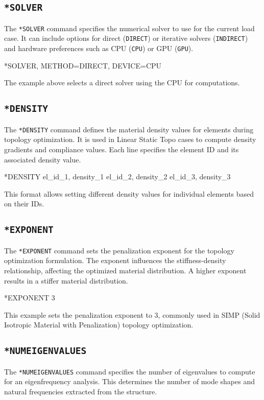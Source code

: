 \subsection{\texttt{*SOLVER}}
The \texttt{*SOLVER} command specifies the numerical solver to use for the current load case.
It can include options for direct (\texttt{DIRECT}) or iterative solvers (\texttt{INDIRECT}) and hardware preferences such as CPU (\texttt{CPU}) or GPU (\texttt{GPU}).

\begin{codeBlock}
*SOLVER, METHOD=DIRECT, DEVICE=CPU
\end{codeBlock}

The example above selects a direct solver using the CPU for computations.

\subsection{\texttt{*DENSITY}}
The \texttt{*DENSITY} command defines the material density values for elements during topology optimization. It is used in Linear Static Topo cases to compute density gradients and compliance values. Each line specifies the element ID and its associated density value.

\begin{codeBlock}
*DENSITY
el_id_1, density_1
el_id_2, density_2
el_id_3, density_3
\end{codeBlock}

This format allows setting different density values for individual elements based on their IDs.

\subsection{\texttt{*EXPONENT}}
The \texttt{*EXPONENT} command sets the penalization exponent for the topology optimization formulation. The exponent influences the stiffness-density relationship, affecting the optimized material distribution. A higher exponent results in a stiffer material distribution.

\begin{codeBlock}
*EXPONENT
3
\end{codeBlock}

This example sets the penalization exponent to 3, commonly used in SIMP (Solid Isotropic Material with Penalization) topology optimization.

\subsection{\texttt{*NUMEIGENVALUES}}
The \texttt{*NUMEIGENVALUES} command specifies the number of eigenvalues to compute for an eigenfrequency analysis. This determines the number of mode shapes and natural frequencies extracted from the structure.

